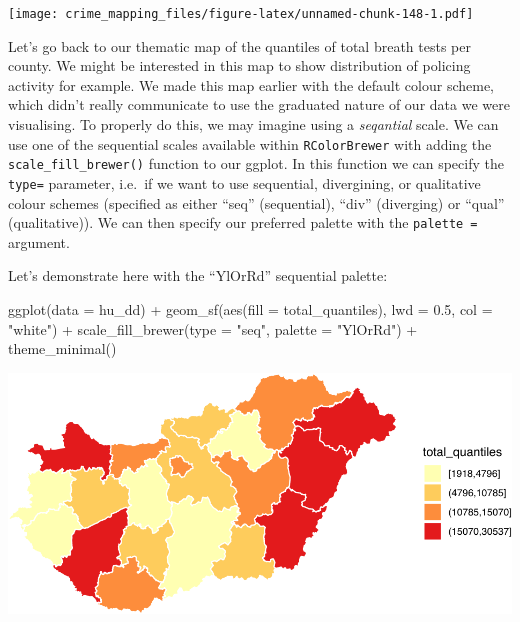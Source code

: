 \documentclass[
]{book}
\newenvironment{Shaded}{\begin{snugshade}}{\end{snugshade}}
\newcommand{\AttributeTok}[1]{\textcolor[rgb]{0.77,0.63,0.00}{#1}}
\newcommand{\FloatTok}[1]{\textcolor[rgb]{0.00,0.00,0.81}{#1}}
\newcommand{\FunctionTok}[1]{\textcolor[rgb]{0.00,0.00,0.00}{#1}}
\newcommand{\NormalTok}[1]{#1}
\newcommand{\SpecialCharTok}[1]{\textcolor[rgb]{0.00,0.00,0.00}{#1}}
\newcommand{\StringTok}[1]{\textcolor[rgb]{0.31,0.60,0.02}{#1}}
\begin{document}
\texttt{[image: crime\_mapping\_files/figure-latex/unnamed-chunk-148-1.pdf]}

Let's go back to our thematic map of the quantiles of total breath tests per county. We might be interested in this map to show distribution of policing activity for example. We made this map earlier with the default colour scheme, which didn't really communicate to use the graduated nature of our data we were visualising. To properly do this, we may imagine using a \emph{seqantial} scale. We can use one of the sequential scales available within \texttt{RColorBrewer} with adding the \texttt{scale\_fill\_brewer()} function to our ggplot. In this function we can specify the \texttt{type=} parameter, i.e.~if we want to use sequential, divergining, or qualitative colour schemes (specified as either ``seq'' (sequential), ``div'' (diverging) or ``qual'' (qualitative)). We can then specify our preferred palette with the \texttt{palette\ =} argument.

Let's demonstrate here with the ``YlOrRd'' sequential palette:

\begin{Shaded}
\begin{Highlighting}[]
\FunctionTok{ggplot}\NormalTok{(}\AttributeTok{data =}\NormalTok{ hu\_dd) }\SpecialCharTok{+} 
  \FunctionTok{geom\_sf}\NormalTok{(}\FunctionTok{aes}\NormalTok{(}\AttributeTok{fill =}\NormalTok{ total\_quantiles), }\AttributeTok{lwd =} \FloatTok{0.5}\NormalTok{, }\AttributeTok{col =} \StringTok{"white"}\NormalTok{) }\SpecialCharTok{+} 
  \FunctionTok{scale\_fill\_brewer}\NormalTok{(}\AttributeTok{type =} \StringTok{"seq"}\NormalTok{, }\AttributeTok{palette =} \StringTok{"YlOrRd"}\NormalTok{) }\SpecialCharTok{+} 
  \FunctionTok{theme\_minimal}\NormalTok{()}
\end{Highlighting}
\end{Shaded}

\includegraphics{crime_mapping_files/figure-latex/colourbbrewerratefill-1.pdf}
\end{document}
